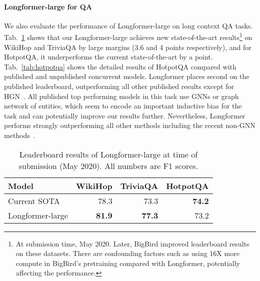 \documentclass[11pt,a4paper]{article}
\newcommand{\model}{Longformer\xspace}
\begin{document}
\paragraph{\model-large for QA}
We also evaluate the performance of \model-large on long context QA tasks. Tab.~\ref{tab:leaderboard}
shows that our \model-large achieves new state-of-the-art
results\footnote{At submission time, May 2020. Later, BigBird \cite{Zaheer2020BigBT} improved leaderboard results on these datasets. There are confounding factors such as using 16X more compute in BigBird's pretraining compared with Longformer, potentially affecting the performance.} on WikiHop and TriviaQA by large margins (3.6 and 4 points respectively), and for HotpotQA, it underperforms the current state-of-the-art \cite{hotpotqasota} by a point.
Tab.~\ref{tab:hotpotqa} shows the detailed results of HotpotQA compared with published and unpublished concurrent models. \model places second on the published leaderboard, outperforming all other published results except for HGN~\cite{hotpotqasota}. All published top performing models in this task \cite{Tu2019SelectAA,hotpotqasota,Shao2020IsGS} use GNNs \cite{kipf2017semi} or graph network of entities, which seem to encode an important inductive bias for the task and can potentially improve our results further. 
Nevertheless, \model performs strongly outperforming all other methods including the recent non-GNN methods~\cite{Gla2019SpanSP,Shao2020IsGS,quark2020}.



























\begin{table}[t]
\centering
\small
\begin{tabular}{@{}lrrr@{}}
\toprule
Model            & WikiHop & TriviaQA & HotpotQA \\ 
\midrule
Current SOTA                   & 78.3 & 73.3 & \textbf{74.2} \\
\model-large    & \textbf{81.9} & \textbf{77.3} & 73.2\\
\bottomrule
\end{tabular}
\caption{Leaderboard results of \model-large at time of submission (May 2020). All numbers are F1 scores.
} 
\label{tab:leaderboard}
\end{table}
\end{document}
